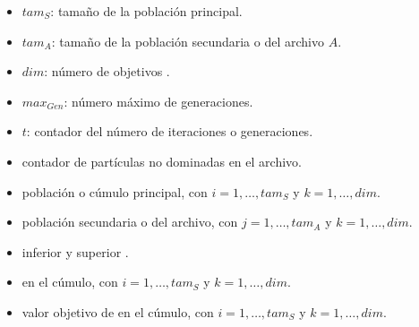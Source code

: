  \begin{itemize}
    \item $tam_S$: \DIFaddbegin {}\DIFaddend tama\~no de la poblaci\'on principal.
    \item $tam_A$: \DIFaddbegin {}\DIFaddend tama\~no de la poblaci\'on secundaria o del archivo $A$.
    \item $dim$: \DIFaddbegin {}\DIFaddend n\'umero de objetivos \DIFaddbegin {}\DIFaddend .
    \item $max_{Gen}$: \DIFaddbegin {}\DIFaddend n\'umero m\'aximo de generaciones.
    \item $t$: \DIFaddbegin {}\DIFaddend contador del n\'umero de iteraciones o generaciones.
    \item \DIFdelbegin {}\DIFdelend \DIFaddbegin {}\DIFaddend contador de part\'iculas no dominadas en el archivo.
    \item \DIFdelbegin {}\DIFdelend \DIFaddbegin {}\DIFaddend poblaci\'on o c\'umulo principal, \DIFaddbegin {}\DIFaddend con $i= 1, \ldots, tam_S$ y $k = 1,\ldots, dim$.  
    \item \DIFdelbegin {}\DIFdelend \DIFaddbegin {}\DIFaddend poblaci\'on secundaria o del archivo, \DIFaddbegin {}\DIFaddend con $j = 1, \ldots, tam_A$ y $k = 1,\ldots, dim$.
    \item \DIFdelbegin {}\DIFdelend \DIFaddbegin {}\DIFaddend inferior y superior \DIFdelbegin {}\DIFdelend \DIFaddbegin {}\DIFaddend .
    \item \DIFdelbegin {}\DIFdelend \DIFaddbegin {}\DIFaddend en el c\'umulo, \DIFaddbegin {}\DIFaddend con $i= 1, \ldots, tam_S$ y $k = 1,\ldots, dim$.
    \item \DIFdelbegin {}\DIFdelend \DIFaddbegin {}\DIFaddend valor objetivo de \DIFdelbegin {}\DIFdelend \DIFaddbegin {}\DIFaddend en el c\'umulo, \DIFaddbegin {}\DIFaddend con $i= 1, \ldots, tam_S$ y $k = 1,\ldots, dim$.

\end{itemize}

